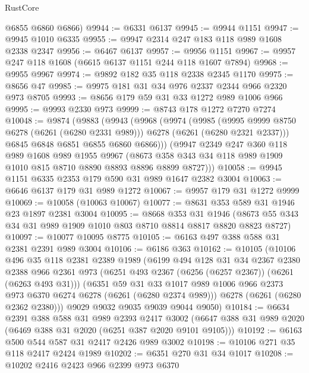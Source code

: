 \begin{lexlean}{RustCore}
\begin{coremodule}
      @6855
      @6860
      @6866)
@9944 := @6331 @6137
@9945 := @9944 @1151
@9947 := @9945 @1010 @6335
@9955 := @9947 @2314 @247 @183 @118 @989 @1608 @2338 @2347
@9956 := @6467 @6137
@9957 := @9956 @1151
@9967 := @9957 @247 @118 @1608 (@6615 @6137 @1151 @244 @118 @1607 @7894)
@9968 := @9955 @9967
@9974 := @9892 @182 @35 @118 @2338 @2345 @1170
@9975 := @8656 @47
@9985 := @9975 @181 @31 @34 @976 @2337 @2344 @966 @2320 @973 @8705
@9993 := @8656 @179 @59 @31 @33 @1272 @989 @1006 @966
@9995 := @9993 @2330 @973
@9999 := @8743 @178 @1272 @7270 @7274
@10048 := @9874
    (@9883
      (@9943
        (@9968
          (@9974
            (@9985
              (@9995 @9999 @8750 @6278 (@6261 (@6280 @2331 @989)))
              @6278
              (@6261 (@6280 @2321 @2337)))
            @6845
            @6848
            @6851
            @6855
            @6860
            @6866)))
      (@9947
        @2349
        @247
        @360
        @118
        @989
        @1608
        @989
        @1955
        @9967
        (@8673 @358 @343 @34 @118 @989 @1909 @1010 @815 @8710 @8890 @8893 @8896 @8899 @8727)))
@10058 := @9945 @1151 @6335 @2353 @179 @590 @31 @989 @1647 @2382 @3004
@10063 := @6646 @6137 @179 @31 @989 @1272
@10067 := @9957 @179 @31 @1272 @9999
@10069 := @10058 (@10063 @10067)
@10077 := @8631 @353 @589 @31 @1946 @23 @1897 @2381 @3004
@10095 := @8668
    @353
    @31
    @1946
    (@8673 @55 @343 @34 @31 @989 @1909 @1010 @803 @8710 @8814 @8817 @8820 @8823 @8727)
@10097 := @10077 @10095 @8775
@10105 := @6163 @497 @388 @588 @31 @2381 @2391 @989 @3004
@10106 := @6186 @363
@10162 := @10105
    (@10106
      @496
      @35
      @118
      @2381
      @2389
      @1989
      (@6199
        @494
        @128
        @31
        @34
        @2367
        @2380
        @2388
        @966
        @2361
        @973
        (@6251 @493 @2367 (@6256 (@6257 @2367)) (@6261 (@6263 @493 @31)))
        (@6351
          @59
          @31
          @33
          @1017
          @989
          @1006
          @966
          @2373
          @973
          @6370
          @6274
          @6278
          (@6261 (@6280 @2374 @989)))
        @6278
        (@6261 (@6280 @2362 @2380)))
      @9029
      @9032
      @9035
      @9039
      @9044
      @9050)
@10184 := @6634
    @2391
    @388
    @588
    @31
    @989
    @2393
    @2417
    @3002
    (@6647 @388 @31 @989 @2020 (@6469 @388 @31 @2020 (@6251 @387 @2020 @9101 @9105)))
@10192 := @6163 @500 @544 @587 @31 @2417 @2426 @989 @3002
@10198 := @10106 @271 @35 @118 @2417 @2424 @1989
@10202 := @6351 @270 @31 @34 @1017
@10208 := @10202 @2416 @2423 @966 @2399 @973 @6370

\end{coremodule}
\end{lexlean}
